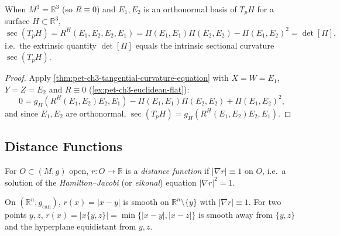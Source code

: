 \begin{corollary}
  \label{cor:pet-ch3-gauss-egregium}
  \leanok
  When $M^3=\mathbb R^3$ (so $R\equiv0$) and $E_1,E_2$ is an orthonormal basis of
  $T_pH$ for a surface $H\subset\mathbb R^3$,
  \[
    \sec(T_pH)=R^H(E_1,E_2,E_2,E_1)=\Pi(E_1,E_1)\Pi(E_2,E_2)-\Pi(E_1,E_2)^2=\det[\Pi],
  \]
  i.e.\ the extrinsic quantity $\det[\Pi]$ equals the intrinsic sectional
  curvature $\sec(T_pH)$.
\end{corollary}
\begin{proof}
  Apply \cref{thm:pet-ch3-tangential-curvature-equation} with $X=W=E_1$,
  $Y=Z=E_2$ and $R\equiv0$ (\cref{ex:pet-ch3-euclidean-flat}):
  \[
    0=g_H(R^H(E_1,E_2)E_2,E_1)-\Pi(E_1,E_1)\Pi(E_2,E_2)+\Pi(E_1,E_2)^2,
  \]
  and since $E_1,E_2$ are orthonormal, $\sec(T_pH)=g_H(R^H(E_1,E_2)E_2,E_1)$.
\end{proof}

\subsection{Distance Functions}

\begin{definition}
  \label{def:pet-ch3-distance-function}
  \leanok
  For $O\subset(M,g)$ open, $r:O\to\mathbb R$ is a \emph{distance function} if
  $|\nabla r|\equiv1$ on $O$, i.e.\ a solution of the \emph{Hamilton--Jacobi} (or
  \emph{eikonal}) equation $|\nabla r|^2=1$.
\end{definition}

\begin{example}[Example 3.2.6]
  \label{ex:pet-ch3-distance-to-points}
  \leanok
  On $(\mathbb R^n,g_{\mathrm{can}})$, $r(x)=|x-y|$ is smooth on $\mathbb
  R^n\setminus\{y\}$ with $|\nabla r|\equiv1$. For two points $y,z$,
  $r(x)=|x\{y,z\}|=\min\{|x-y|,|x-z|\}$ is smooth away from $\{y,z\}$ and the
  hyperplane equidistant from $y,z$.
\end{example}

